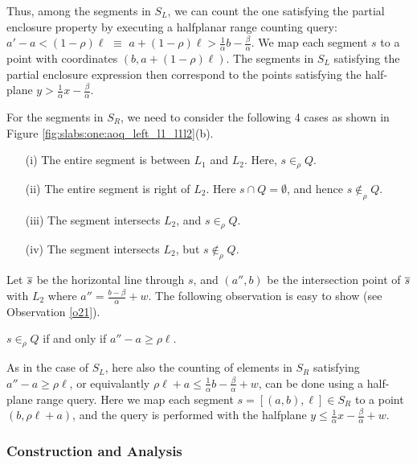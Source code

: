 Thus, among the segments in $S_L$, we can count the one satisfying the 
partial enclosure property by executing a halfplanar range counting query:
$a' - a < (1 - \rho)\ell$ $\equiv$ $a + (1 - \rho)\ell > \frac{1}{\alpha} b - \frac{\beta}{\alpha}$. We map each segment $s$ to a point with coordinates 
$(b, a + (1-\rho)\ell)$. The segments in $S_L$ 
satisfying the partial enclosure expression then correspond to the points 
satisfying the half-plane $y > \frac{1}{\alpha}x - \frac{\beta}{\alpha}$.


For the segments in $S_R$, we need to consider the following 
4 cases as shown in Figure \ref{fig:slabs:one:aoq_left_l1_l1l2}(b).



\begin{itemize}
 \item[(i)] The entire segment is between $L_1$ and $L_2$. Here, $s \in_\rho Q$.
 \item[(ii)] The entire segment is right of $L_2$. Here $s \cap Q = \emptyset$, 
 and hence $s \not \in_\rho Q$.
 \item[(iii)] The segment intersects $L_2$, and $s \in_\rho Q$.
 \item[(iv)] The segment intersects $L_2$, but $s \not \in_\rho Q$.
\end{itemize}
Let $\overline{s}$ be the horizontal line through $s$, and $(a'', b)$ be the 
intersection point of $\overline{s}$ with $L_2$ where $a'' = \frac{b - \beta}{\alpha}
 + w$. The following observation is easy to show (see Observation \ref{o21}).
\begin{observation} 
$s \in_\rho Q$ if and only if 
 $a'' - a \geq \rho \ell$.
\end{observation}
As in the case of $S_L$, here also the counting of elements in $S_R$ 
satisfying $a'' - a \geq \rho \ell$, or equivalantly $\rho \ell + a 
\leq \frac{1}{\alpha} b - \frac{\beta}{\alpha} + w$, can be done using 
a half-plane range query. Here we map each segment $s=[(a,b),\ell]\in 
S_R$ to a point $(b, \rho \ell + a)$, and the query is performed with 
the halfplane  $y \leq \frac{1}{\alpha} x - \frac{\beta}{\alpha} + w$.

\subsubsection{Construction and Analysis}
\label{:slabs:one:analysis}

